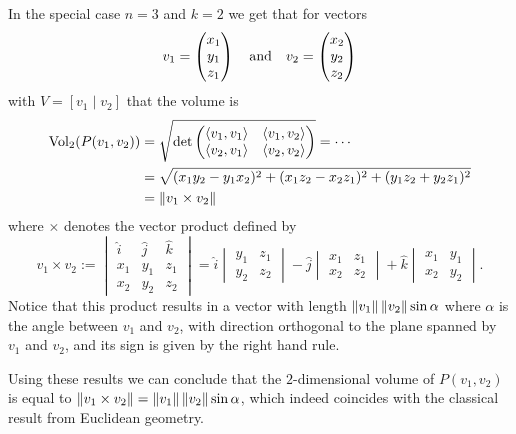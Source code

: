 \documentclass[11pt,a4paper]{article}
\begin{document}
\begin{example}
  \label{exmp:surface-area-two-dimensions}
  In the special case $n = 3$ and $k = 2$ we get that for vectors
  \[
    v_1 =
    \begin{pmatrix} x_1 \\ y_1 \\ z_1 \end{pmatrix} \quad \text{and} \quad
    v_2 =
    \begin{pmatrix} x_2 \\ y_2 \\ z_2 \end{pmatrix}
  \]
  with $V = \left[v_1 \mid v_2\right]$ that the volume is
  \begin{align*}
    \operatorname{Vol}_2(P(v_1,v_2)) &=
    \sqrt{\det
    \begin{pmatrix}
      \left\langle v_1, v_1 \right\rangle & \left\langle v_1, v_2 \right\rangle \\
      \left\langle v_2, v_1 \right\rangle & \left\langle v_2, v_2 \right\rangle
    \end{pmatrix}} = \cdots \\ &=
    \sqrt{(x_1 y_2 - y_1 x_2)^2 
    + (x_1 z_2 - x_2 z_1)^2 + (y_1 z_2 + y_2 z_1)^2} \\ &=
    \left\lVert v_1 \times v_2\right\rVert
    \end{align*}
    where $\times$ denotes the vector product defined by
    \[
      v_1 \times v_2 :=
      \begin{vmatrix}
        \hat i & \hat j & \hat k \\
        x_1 & y_1 & z_1 \\
        x_2 & y_2 & z_2
      \end{vmatrix} =
      \hat i
      \begin{vmatrix}
        y_1 & z_1 \\
        y_2 & z_2
      \end{vmatrix} -
      \hat j
      \begin{vmatrix}
        x_1 & z_1 \\
        x_2 & z_2
      \end{vmatrix} +
      \hat k
      \begin{vmatrix}
        x_1 & y_1 \\
        x_2 & y_2
      \end{vmatrix}.
    \]
    Notice that this product results in a vector with length
    $\left\lVert v_1\right\rVert \left\lVert v_2\right\rVert \sin \alpha$ where $\alpha$ is the
    angle between $v_1$ and $v_2$, with direction orthogonal to the
    plane spanned by $v_1$ and $v_2$, and its sign is given by
    the right hand rule.

    Using these results we can conclude that the $2$-dimensional volume
    of $P(v_1,v_2)$ is equal to
    $\left\lVert v_1 \times v_2\right\rVert = \left\lVert v_1\right\rVert \left\lVert v_2\right\rVert \sin \alpha$,
    which indeed coincides with the classical result from Euclidean
    geometry.
\end{example}
\end{document}

